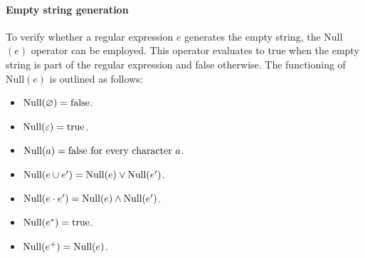 \paragraph*{Empty string generation}
To verify whether a regular expression $e$ generates the empty string, the Null$(e)$ operator can be employed. 
This operator evaluates to true when the empty string is part of the regular expression and false otherwise. 
The functioning of Null$(e)$ is outlined as follows:
\begin{itemize}
    \item $\textnormal{Null}(\varnothing)=\textnormal{false}$. 
    \item $\textnormal{Null}(\varepsilon)=\textnormal{true}$. 
    \item $\textnormal{Null}(a)=\textnormal{false for every character } a$.
    \item $\textnormal{Null}(e \cup e^{\prime})=\textnormal{Null}(e) \lor \textnormal{Null}(e^{\prime})$.
    \item $\textnormal{Null}(e \cdot e^{\prime})=\textnormal{Null}(e) \land \textnormal{Null}(e^{\prime})$.
    \item $\textnormal{Null}(e^{\ast})=\textnormal{true}$. 
    \item $\textnormal{Null}(e^{+})=\textnormal{Null}(e)$. 
\end{itemize}

